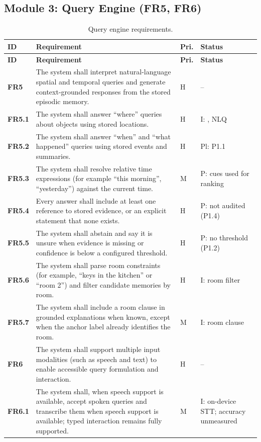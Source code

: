 \subsection{Module 3: Query Engine (FR5, FR6)}
\begin{ltab}
\begin{longtable}{@{}>{\bfseries}L{1.2cm}L{9.6cm}L{0.8cm}L{3.0cm}@{}}
\caption{Query engine requirements.}\\
\toprule
{}\textbf{ID} & \textbf{Requirement} & \textbf{Pri.} & \textbf{Status}\\
\midrule
\endfirsthead
\toprule
{}\textbf{ID} & \textbf{Requirement} & \textbf{Pri.} & \textbf{Status}\\
\midrule
\endhead
\bottomrule
\endfoot
{}FR5 & The system shall interpret natural-language spatial and
temporal queries and generate context-grounded responses from the stored
episodic memory. & H & --\\
FR5.1 & The system shall answer ``where'' queries about objects using stored
locations. & H & I: , NLQ\\
FR5.2 & The system shall answer ``when'' and ``what happened'' queries using
stored events and summaries. & H & Pl: P1.1\\
FR5.3 & The system shall resolve relative time expressions (for example ``this
morning'', ``yesterday'') against the current time. & M & P: cues used for ranking\\
FR5.4 & Every answer shall include at least one reference to stored evidence, or
an explicit statement that none exists. & H & P: not audited (P1.4)\\
FR5.5 & The system shall abstain and say it is unsure when evidence is missing or
confidence is below a configured threshold. & H & P: no threshold (P1.2)\\
FR5.6 & The system shall parse room constraints (for example, ``keys in the kitchen'' or ``room 2'') and filter candidate memories by room. & H & I: room filter\\
FR5.7 & The system shall include a room clause in grounded explanations when known, except when the anchor label already identifies the room. & M & I: room clause\\
FR6 & The system shall support multiple input modalities
(such as speech and text) to enable accessible query formulation and
interaction. & H & --\\
FR6.1 & The system shall, when speech support is available, accept spoken queries and transcribe them when speech support is available; typed interaction remains fully supported. & M & I: on-device STT; accuracy unmeasured\\

\end{longtable}
\end{ltab}
